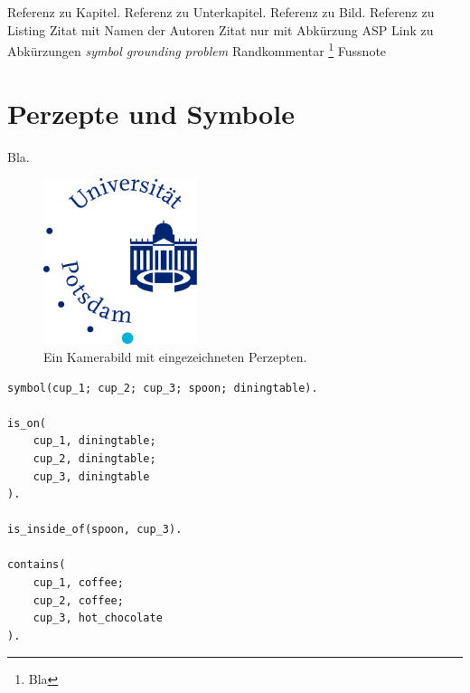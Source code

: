  Referenz zu Kapitel.
 Referenz zu Unterkapitel. 
 Referenz zu Bild.
 Referenz zu Listing
\textcite{Jan+10} Zitat mit Namen der Autoren
\cite{Jan+10} Zitat nur mit Abkürzung
\ac{ASP} Link zu Abkürzungen
\emph{symbol grounding problem} 
 Randkommentar
\footnote{Bla} Fussnote

\section{Perzepte und Symbole}
\label{sec:Test/Perzepte_und_Symbole}
Bla.


\begin{figure}
    \centering
    \includegraphics[width=0.4\textwidth]{gfx/unilogo.jpg}
    \caption{Ein Kamerabild mit eingezeichneten Perzepten.}
    \label{fig:cups_yolo}
\end{figure}


\begin{lstlisting}[float,caption={Eine symbolische Beschreibung der Objekte in bla.},label=lst:cups_symbolic]
symbol(cup_1; cup_2; cup_3; spoon; diningtable).

is_on(
    cup_1, diningtable;
    cup_2, diningtable;
    cup_3, diningtable
).

is_inside_of(spoon, cup_3).

contains(
    cup_1, coffee;
    cup_2, coffee;
    cup_3, hot_chocolate
).

\end{lstlisting}



